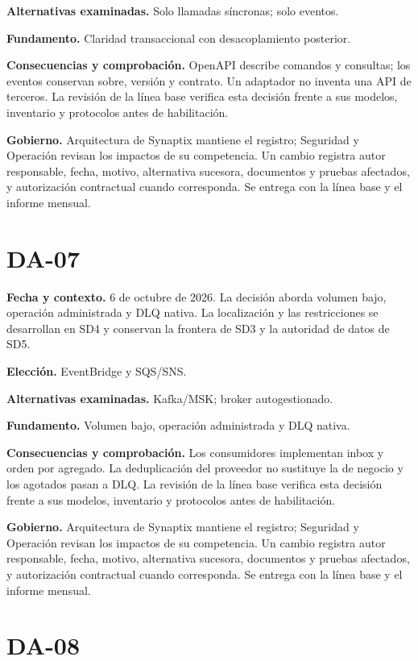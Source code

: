 \documentclass[11pt,letterpaper]{report}
\begin{document}
\textbf{Alternativas examinadas.} Solo llamadas síncronas; solo eventos.

\textbf{Fundamento.} Claridad transaccional con desacoplamiento posterior.

\textbf{Consecuencias y comprobación.} OpenAPI describe comandos y consultas; los eventos conservan sobre, versión y contrato. Un adaptador no inventa una API de terceros. La revisión de la línea base verifica esta decisión frente a sus modelos, inventario y protocolos antes de habilitación.

\textbf{Gobierno.} Arquitectura de Synaptix mantiene el registro; Seguridad y Operación revisan los impactos de su competencia. Un cambio registra autor responsable, fecha, motivo, alternativa sucesora, documentos y pruebas afectados, y autorización contractual cuando corresponda. Se entrega con la línea base y el informe mensual.

\section*{DA-07}

\textbf{Fecha y contexto.} 6 de octubre de 2026. La decisión aborda volumen bajo, operación administrada y DLQ nativa. La localización y las restricciones se desarrollan en SD4 y conservan la frontera de SD3 y la autoridad de datos de SD5.

\textbf{Elección.} EventBridge y SQS/SNS.

\textbf{Alternativas examinadas.} Kafka/MSK; broker autogestionado.

\textbf{Fundamento.} Volumen bajo, operación administrada y DLQ nativa.

\textbf{Consecuencias y comprobación.} Los consumidores implementan inbox y orden por agregado. La deduplicación del proveedor no sustituye la de negocio y los agotados pasan a DLQ. La revisión de la línea base verifica esta decisión frente a sus modelos, inventario y protocolos antes de habilitación.

\textbf{Gobierno.} Arquitectura de Synaptix mantiene el registro; Seguridad y Operación revisan los impactos de su competencia. Un cambio registra autor responsable, fecha, motivo, alternativa sucesora, documentos y pruebas afectados, y autorización contractual cuando corresponda. Se entrega con la línea base y el informe mensual.

\section*{DA-08}
\end{document}
